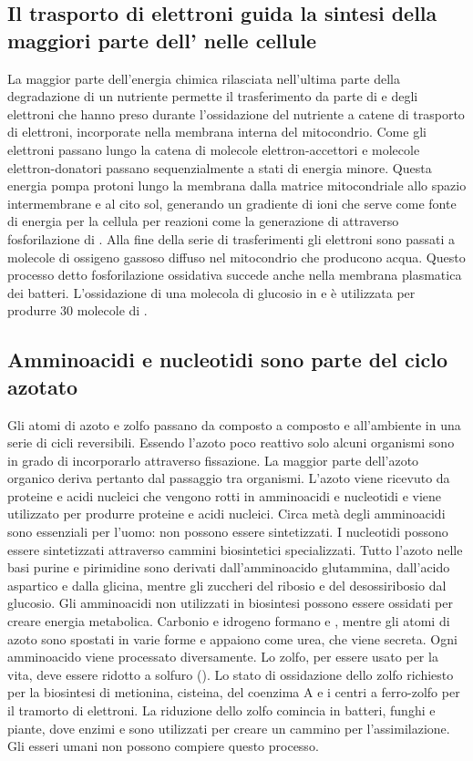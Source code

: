 \subsection{Il trasporto di elettroni guida la sintesi della maggiori parte dell' nelle cellule}
La maggior parte dell'energia chimica rilasciata nell'ultima parte della degradazione di un nutriente permette il trasferimento da parte di  e  degli elettroni che
hanno preso durante l'ossidazione del nutriente a catene di trasporto di elettroni, incorporate nella membrana interna del mitocondrio. Come gli elettroni passano lungo la catena di
molecole elettron-accettori e molecole elettron-donatori passano sequenzialmente a stati di energia minore. Questa energia pompa protoni  lungo la membrana dalla matrice 
mitocondriale allo spazio intermembrane e al cito sol, generando un gradiente di ioni  che serve come fonte di energia per la cellula per reazioni come la generazione di 
attraverso fosforilazione di . Alla fine della serie di trasferimenti gli elettroni sono passati a molecole di ossigeno gassoso diffuso nel mitocondrio che producono acqua. 
Questo processo detto fosforilazione ossidativa succede anche nella membrana plasmatica dei batteri. L'ossidazione di una molecola di glucosio in  e  \`e utilizzata per
produrre $30$ molecole di .
\subsection{Amminoacidi e nucleotidi sono parte del ciclo azotato}
Gli atomi di azoto e zolfo passano da composto a composto e all'ambiente in una serie di cicli reversibili. Essendo l'azoto poco reattivo solo alcuni organismi sono in grado di 
incorporarlo attraverso fissazione. La maggior parte dell'azoto organico deriva pertanto dal passaggio tra organismi. L'azoto viene ricevuto da proteine e acidi nucleici che vengono
rotti in amminoacidi e nucleotidi e viene utilizzato per produrre proteine e acidi nucleici. Circa met\`a degli amminoacidi sono essenziali per l'uomo: non possono essere sintetizzati. 
I nucleotidi possono essere sintetizzati attraverso cammini biosintetici specializzati. Tutto l'azoto nelle basi purine e pirimidine sono derivati dall'amminoacido glutammina, dall'acido
aspartico e dalla glicina, mentre gli zuccheri del ribosio e del desossiribosio dal glucosio. Gli amminoacidi non utilizzati in biosintesi possono essere ossidati per creare energia
metabolica. Carbonio e idrogeno formano  e , mentre gli atomi di azoto sono spostati in varie forme e appaiono come urea, che viene secreta. Ogni amminoacido viene
processato diversamente. Lo zolfo, per essere usato per la vita, deve essere ridotto a solfuro (). Lo stato di ossidazione dello zolfo richiesto per la biosintesi di 
metionina, cisteina, del coenzima A e i centri a ferro-zolfo per il tramorto di elettroni. La riduzione dello zolfo comincia in batteri, funghi e piante, dove enzimi e  sono 
utilizzati per creare un cammino per l'assimilazione. Gli esseri umani non possono compiere questo processo.
